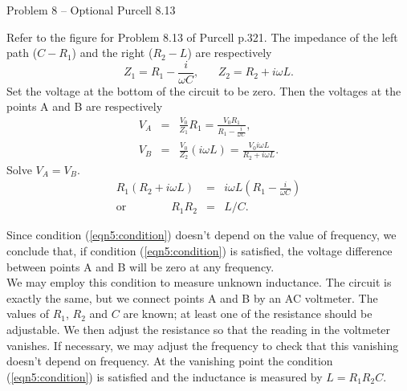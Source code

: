 \documentclass[makesolutionspdf]{esg8022pset}
\begin{document}
\begin{problem}{Problem 8 -- Optional Purcell 8.13}
\end{problem}
\begin{solution}
Refer to the figure for Problem 8.13 of Purcell p.321.  The impedance
of the left path ($C-R_1$) and the right ($R_2 - L$) are respectively
\[Z_1=R_1-\frac{i}{\omega C},\;\;\;\;\;\; Z_2=R_2+i\omega L.\]
Set the voltage at the bottom of the circuit to be zero.  Then the
voltages at the points A and B are respectively
\begin{eqnarray}
V_A &=& \frac{V_0}{Z_1} R_1= \frac{V_0 R_1}{R_1-\frac{i}{\omega
C}},\nonumber\\
V_B &=& \frac{V_0}{Z_2} (i\omega L)=\frac{V_0 i\omega L}{R_2+i\omega L}.
\end{eqnarray}
Solve $V_A=V_B$.
\begin{eqnarray}
R_1(R_2+i\omega L) &=& i\omega L (R_1-\frac{i}{\omega C})\nonumber\\
\textrm{or}\qquad\qquad R_1 R_2 &=& L/C.\label{eqn5:condition}
\end{eqnarray}

Since condition (\ref{eqn5:condition}) doesn't depend on the value of
frequency, we conclude that, if condition (\ref{eqn5:condition}) is
satisfied, the voltage difference between points A and B will be zero
at any frequency.\\

We may employ this condition to measure unknown inductance.  The
circuit is exactly the same, but we connect points A and B by an AC
voltmeter.  The values of $R_1$, $R_2$ and $C$ are known; at least one
of the resistance should be adjustable.  We then adjust the resistance
so that the reading in the voltmeter vanishes.  If necessary, we may
adjust the frequency to check that this vanishing doesn't depend on
frequency.  At the vanishing point the condition
(\ref{eqn5:condition}) is satisfied and the inductance is measured by
$L=R_1 R_2 C$.

\end{solution}
\end{document}
